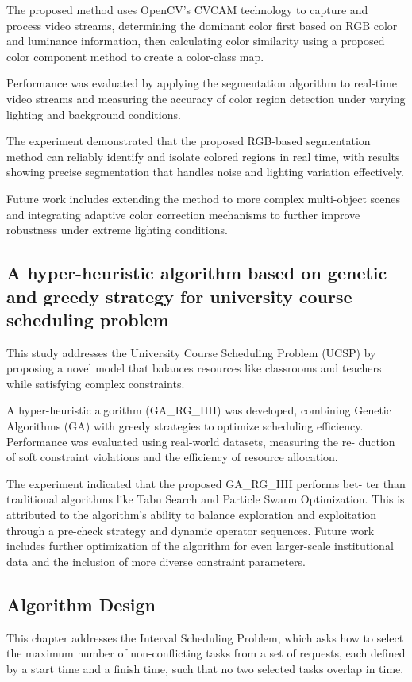 The proposed method uses OpenCV's CVCAM technology to capture and process video streams, determining the dominant color first based on RGB color and luminance information, then calculating color similarity using a proposed color component method to create a color-class map. 

Performance was evaluated by applying the segmentation algorithm to real-time video streams and measuring the accuracy of color region detection under varying lighting and background conditions.

The experiment demonstrated that the proposed RGB-based segmentation method can reliably identify and isolate colored regions in real time, with results showing precise segmentation that handles noise and lighting variation effectively. 

Future work includes extending the method to more complex multi-object scenes and integrating adaptive color correction mechanisms to further improve robustness under extreme lighting conditions.

\subsection{A hyper-heuristic algorithm based on genetic and greedy strategy for university course scheduling problem \cite{paper_3}}

This study addresses the University Course Scheduling Problem (UCSP) by proposing a novel model that balances resources like classrooms and teachers while satisfying complex constraints.

A hyper-heuristic algorithm (GA\_RG\_HH) was developed, combining Genetic Algorithms (GA) with greedy strategies to optimize scheduling efficiency.
Performance was evaluated using real-world datasets, measuring the re- duction of soft constraint violations and the efficiency of resource allocation.

The experiment indicated that the proposed GA\_RG\_HH performs bet- ter than traditional algorithms like Tabu Search and Particle Swarm Optimization. This is attributed to the algorithm's ability to balance exploration and exploitation through a pre-check strategy and dynamic operator sequences.
Future work includes further optimization of the algorithm for even larger-scale institutional data and the inclusion of more diverse constraint parameters.

\subsection{Algorithm Design \cite{kleinberg2005algorithm}}
This chapter addresses the Interval Scheduling Problem, which asks how to select the maximum number of non-conflicting tasks from a set of requests, each defined by a start time and a finish time, such that no two selected tasks overlap in time.

